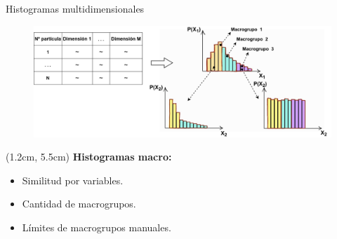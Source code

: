 \documentclass[aspectratio=169,english]{beamer}
\begin{document}


\begin{frame}{Histogramas multidimensionales}
    \begin{figure}
        \centering
        \includegraphics[width=1\linewidth]{imagens/tabla.png}
        \label{fig:esquema2}
    \end{figure}

    
    \begin{textblock*}{10cm}(1.2cm, 5.5cm) %
        \textbf{Histogramas macro:}
            \begin{itemize}
                    \item Similitud por variables.
                    \item Cantidad de macrogrupos.
                    \item Límites de macrogrupos manuales. 
            \end{itemize} 
    \end{textblock*}

\end{frame}
\end{document}
